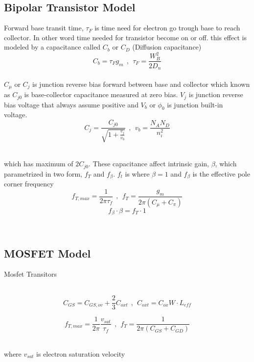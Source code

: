 \subsection{Bipolar Transistor Model}\vspace{0.5em}
Forward base transit time, $\tau_F$ is time need for electron go trough base to reach collector. In other word time needed for transistor become on or off. this effect is modeled by a capacitance called $C_b$ or $C_D$ (Diffusion capacitance) ~\\
\begin{equation}
C_b = \tau_F g_m ~~ , ~~\tau_F = \frac{W_B^2}{2D_n}
\end{equation}
~\\
$C_{\mu}$ or $C_j$ is junction reverse bias forward between base and collector which known as $C_{j0}$ is base-collector capacitance measured at zero bias. $V_j$ is junction reverse bias voltage that always assume positive and $V_b$ or $\phi_0$ is junction built-in voltage.~\\

\begin{equation}
C_j = \frac{C_{j0}}{\sqrt{1 + \frac{v_j}{v_b}}} ~~ , ~~ v_b = \frac{N_A N_D}{n_i^2} 
\end{equation}

~\\which has maximum of $ 2 C_{j0} $. These capacitance affect intrinsic gain, $\beta$, which parametrized in two form, $f_T$ and $f_{\beta}$. $f_t$ is where $\beta=1$ and $f_{\beta}$ is the effective pole corner frequency~\\

\begin{equation}
f_{T,max} = \frac{1}{2\pi\tau_f} ~~ , ~~ f_{T} = \frac{g_m}{2\pi (C_{\mu} + C_\pi)}
\end{equation}
\begin{equation}
f_{\beta} \cdot \beta = f_T \cdot 1
\end{equation}

~

\par
\setlength{\parindent}{0.5cm} %
\lipsum[1]
\setlength{\parindent}{0.0cm} 
\subsection{MOSFET Model}\vspace{0.5em}
Mosfet Transitors

~\\
\begin{equation}
C_{GS} = C_{GS,ov} + \frac{2}{3} C_{oxt} ~~ , ~~ C_{oxt} = C_{ox} W \cdot L_{eff}
\end{equation}

\begin{equation}
f_{T,max} = \frac{1}{2\pi}\frac{v_{sat}}{\tau_f} ~~ , ~~ f_{T} = \frac{1}{2\pi (C_{GS} + C_{GD})}
\end{equation}~

where $v_{sat}$ is electron saturation velocity
